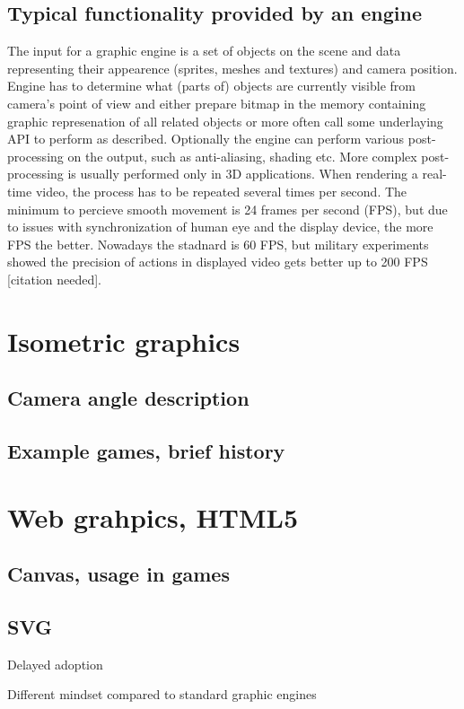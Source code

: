 \documentclass[11pt,oneside, final]{fithesis2}
\begin{document}
\subsection{Typical functionality provided by an engine}
The input for a graphic engine is a set of objects on the scene and data representing their appearence (sprites, meshes and textures) and camera position. Engine has to determine what (parts of) objects are currently visible from camera's point of view and either prepare bitmap in the memory containing graphic represenation of all related objects or more often call some underlaying API to perform as described. Optionally the engine can perform various post-processing on the output, such as anti-aliasing, shading etc. More complex post-processing is usually performed only in 3D applications. When rendering a real-time video, the process has to be repeated  several times per second. The minimum to percieve smooth movement is 24 frames per second (FPS), but due to issues with synchronization of human eye and the display device, the more FPS the better. Nowadays the stadnard is 60 FPS, but military experiments showed the precision of actions in displayed video gets better up to 200 FPS [citation needed].

\section{Isometric graphics}
\subsection{Camera angle description}
\subsection{Example games, brief history}

\section{Web grahpics, HTML5}
\subsection{Canvas, usage in games}
\subsection{SVG}
Delayed adoption

Different mindset compared to standard graphic engines
\end{document}

